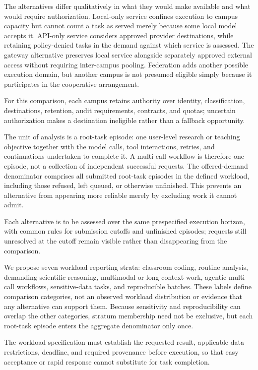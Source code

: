 \documentclass[11pt]{article}
\begin{document}
The alternatives differ qualitatively in what they would make available and what would require authorization. Local-only service confines execution to campus capacity but cannot count a task as served merely because some local model accepts it. API-only service considers approved provider destinations, while retaining policy-denied tasks in the demand against which service is assessed. The gateway alternative preserves local service alongside separately approved external access without requiring inter-campus pooling. Federation adds another possible execution domain, but another campus is not presumed eligible simply because it participates in the cooperative arrangement.

For this comparison, each campus retains authority over identity, classification, destinations, retention, audit requirements, contracts, and quotas; uncertain authorization makes a destination ineligible rather than a fallback opportunity.

The unit of analysis is a root-task episode: one user-level research or teaching objective together with the model calls, tool interactions, retries, and continuations undertaken to complete it. A multi-call workflow is therefore one episode, not a collection of independent successful requests. The offered-demand denominator comprises all submitted root-task episodes in the defined workload, including those refused, left queued, or otherwise unfinished. This prevents an alternative from appearing more reliable merely by excluding work it cannot admit.

Each alternative is to be assessed over the same prespecified execution horizon, with common rules for submission cutoffs and unfinished episodes; requests still unresolved at the cutoff remain visible rather than disappearing from the comparison.

We propose seven workload reporting strata: classroom coding, routine analysis, demanding scientific reasoning, multimodal or long-context work, agentic multi-call workflows, sensitive-data tasks, and reproducible batches. These labels define comparison categories, not an observed workload distribution or evidence that any alternative can support them. Because sensitivity and reproducibility can overlap the other categories, stratum membership need not be exclusive, but each root-task episode enters the aggregate denominator only once.

The workload specification must establish the requested result, applicable data restrictions, deadline, and required provenance before execution, so that easy acceptance or rapid response cannot substitute for task completion.
\end{document}
